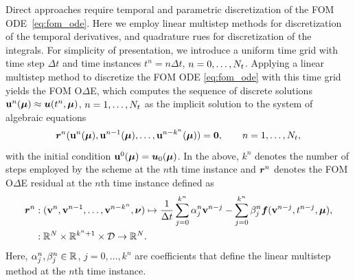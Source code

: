 \documentclass[3p,computermodern,10pt]{elsarticle}
\begin{document}
Direct approaches require temporal and parametric discretization of the FOM ODE~\eqref{eq:fom_ode}. Here we employ linear multistep methods for discretization of the temporal derivatives, and quadrature rues for discretization of the integrals. For simplicity of presentation, we introduce a uniform time
grid with time step $\Delta t$ and time instances
$t^n = n\Delta
t$, $n=0,\ldots,N_t$. 
Applying a linear multistep method to discretize the FOM ODE \eqref{eq:fom_ode}
with this time grid
yields the FOM O$\Delta$E, which computes the sequence of discrete
solutions
$\mathbf{u}^n(\boldsymbol \mu) \approx \boldsymbol u(t^n,\boldsymbol \mu)$, $n=1,\ldots,N_t$
as the implicit solution to the system of algebraic equations
\begin{equation}\label{eq:lms}
\boldsymbol{r}^n
	(\mathbf{u}^n(\boldsymbol \mu),\mathbf{u}^{n-1}(\boldsymbol \mu),\ldots,\mathbf{u}^{n-k^n}(\boldsymbol \mu))
	= \boldsymbol 0,\qquad n=1,\ldots,N_t,
\end{equation}
with the initial condition $\mathbf{u}^0(\boldsymbol \mu) =\boldsymbol u_0(\boldsymbol \mu)$. In the above, $k^n$ denotes the number of steps employed by the scheme at the $n$th
time instance and 
$\boldsymbol{r}^n$ denotes the FOM O$\Delta$E residual at the $n$th time instance defined as
\begin{align*}
\boldsymbol{r}^n &: (\mathbf{v}^n,\mathbf{v}^{n-1},\ldots,\mathbf{v}^{n-k^n},\boldsymbol \nu) \mapsto  \frac{1}{\Delta t} \sum_{j=0}^{k^n} \alpha^n_j \mathbf{v}^{n-j} -  \sum_{j=0}^{k^n} \beta^n_j \boldsymbol f(\mathbf{v}^{n-j},t^{n-j},\boldsymbol \mu),
\\
&: \mathbb{R}^{N} \times \mathbb{R}^{k^n + 1} \times \mathcal{D} \rightarrow \mathbb{R}^{N}.
\end{align*} 
Here, $\alpha^n_j,\beta^n_j\in\mathbb{R}^{}$, $j=0,\ldots,k^n$ are coefficients
that define the linear multistep method at the $n$th time instance.
 
\end{document}
